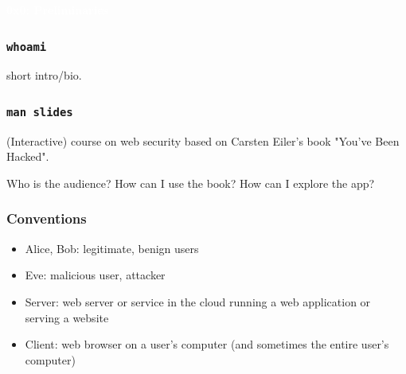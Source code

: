 \documentclass[aspectratio=169]{beamer}
\begin{document}
{
\begin{frame}
\huge{\textcolor{white}{\textbf{0x0: Preliminaries}}}
\end{frame}
}

\begin{frame}
    \frametitle{\texttt{whoami}}
    short intro/bio.
\end{frame}

\begin{frame}
    \frametitle{\texttt{man slides}}

    (Interactive) course on web security based on Carsten Eiler's book "You've Been Hacked".
    
    Who is the audience? How can I use the book? How can I explore the app?
\end{frame}

\begin{frame}
    \frametitle{Conventions}
    \begin{itemize}
        \item Alice, Bob: legitimate, benign users
        \item Eve: malicious user, attacker
        \item Server: web server or service in the cloud running a web application or serving a website
        \item Client: web browser on a user's computer (and sometimes the entire user's computer)
    \end{itemize}

\end{frame}
\end{document}
